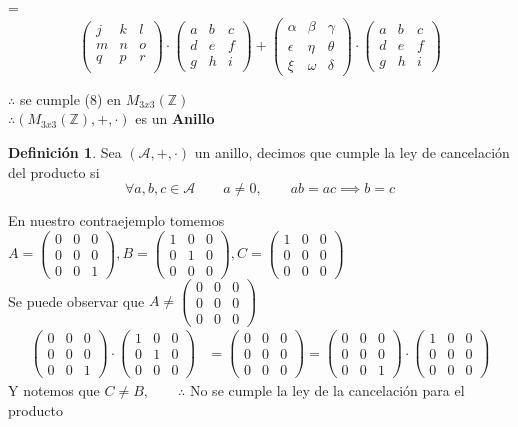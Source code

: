\documentclass[letterpaper]{article}
\newcommand{\A}{\mathcal{A}}
\newcommand{\Ceros}{\begin{pmatrix}
		0 & 0 & 0\\
		0 & 0 & 0\\
		0 & 0 & 0 
\end{pmatrix}}
\newcommand{\Nmat}{\begin{pmatrix}
		j & k & l\\
		m & n & o\\
		q & p & r\\
\end{pmatrix}}
\newcommand{\Pmat}{\begin{pmatrix}
		\alpha & \beta & \gamma\\
		\epsilon & \eta & \theta\\
		\xi & \omega & \delta
\end{pmatrix}}
\newcommand{\Mmat}{\begin{pmatrix}
		a & b & c\\
		d & e & f\\
		g & h & i
\end{pmatrix}}
\newcommand{\mtt}{M_{3x3}(\mathds{Z})}
\renewcommand{\*}{\cdot}
\theoremstyle{definition}
\newtheorem{definition}{Definición}
\begin{document}
\centering =
$$
\Nmat \* \Mmat + \Pmat \* \Mmat 
$$
\begin{center}
	$ \therefore $ se cumple (8) en $ \mtt $\\
	
	$ \therefore (\mtt, +, \*) $ es un \textbf{Anillo}
\end{center}
\begin{definition}
	Sea $ (\A, +, \*) $ un anillo, decimos que cumple la ley de cancelación del producto si
	\[ \forall a,b,c \in  \A \qquad a \neq 0, \qquad ab = ac \implies b = c \]
\end{definition}	
En nuestro contraejemplo tomemos $ A = \begin{pmatrix}
0 & 0 & 0\\
0 & 0 & 0\\
0 & 0 & 1
\end{pmatrix},
B = \begin{pmatrix}
1 & 0 & 0 \\
0 & 1 & 0 \\
0 & 0 & 0 
\end{pmatrix}, C = \begin{pmatrix}
1 & 0 & 0 \\
0 & 0 & 0 \\
0 & 0 & 0 
\end{pmatrix} 
$
\\Se puede observar que $ A \neq \Ceros $
\begin{align*}
	\begin{pmatrix}
	0 & 0 & 0\\
	0 & 0 & 0\\
	0 & 0 & 1
	\end{pmatrix} \* \begin{pmatrix}
	1 & 0 & 0 \\
	0 & 1 & 0 \\
	0 & 0 & 0 
	\end{pmatrix} & = \Ceros =
	\begin{pmatrix}
	0 & 0 & 0\\
	0 & 0 & 0\\
	0 & 0 & 1
	\end{pmatrix} \* \begin{pmatrix}
	1 & 0 & 0 \\
	0 & 0 & 0 \\
	0 & 0 & 0 
	\end{pmatrix} 
\end{align*}
Y notemos que $ C \neq B, \qquad \therefore $ No se cumple la ley de la cancelación para el producto
\end{document}
